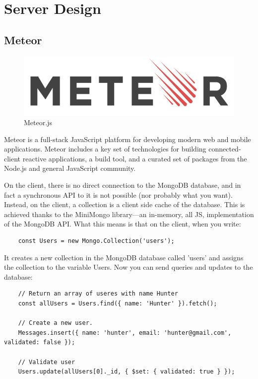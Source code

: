 \documentclass[12pt,a4paper]{report}
\begin{document}
	\newpage
	\section {Server Design}
	\subsection{Meteor}
	\begin{figure}
		\includegraphics[scale=.2]{meteorJS}
		\caption{Meteor.js}
		\label{fig: Meteor.js}
	\end{figure}
	Meteor is a full-stack JavaScript platform for developing modern web and mobile applications. Meteor includes a key set of technologies for building connected-client reactive applications, a build tool, and a curated set of packages from the Node.js and general JavaScript community.
	
	
	
	On the client, there is no direct connection to the MongoDB database, and in fact a synchronous API to it is not possible (nor probably what you want). Instead, on the client, a collection is a client side cache of the database. This is achieved thanks to the MiniMongo library—an in-memory, all JS, implementation of the MongoDB API. What this means is that on the client, when you write:
	
	\begin{lstlisting}
	const Users = new Mongo.Collection('users');
	\end{lstlisting}
	
	It creates a new collection in the MongoDB database called 'users' and assigns the collection to the variable Users. Now you can send queries and updates to the database:
	
	\begin{lstlisting}
	// Return an array of useres with name Hunter
	const allUsers = Users.find({ name: 'Hunter' }).fetch();
	
	// Create a new user.
	Messages.insert({ name: 'hunter', email: 'hunter@gmail.com', validated: false });
	
	// Validate user
	Users.update(allUsers[0]._id, { $set: { validated: true } });
	\end{lstlisting}
	
\end{document}

